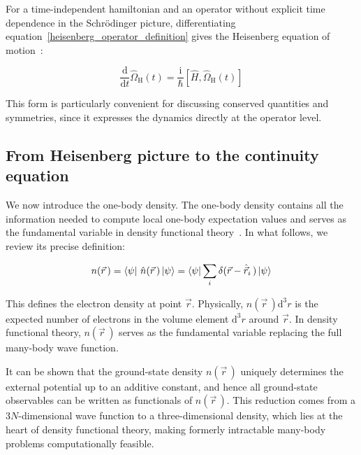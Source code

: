 For a time-independent hamiltonian and an operator without explicit time dependence in the Schrödinger picture, differentiating equation~\eqref{heisenberg_operator_definition} gives the Heisenberg equation of motion~\cite{shankar2012principles}:

\begin{equation}
    \frac{\mathrm{d}}{\mathrm{d}t}\hat{\Omega}_\mathrm{H}(t)
    =\frac{\mathrm{i}}{\hbar}\left[\hat{H},\hat{\Omega}_\mathrm{H}(t)\right]
\label{heisenberg_equation_of_motion}
\end{equation}

This form is particularly convenient for discussing conserved quantities and symmetries, since it expresses the dynamics directly at the operator level.

\FloatBarrier
\subsection{From Heisenberg picture to the continuity equation}

We now introduce the one-body density.
The one-body density contains all the information needed to compute local one-body expectation values and serves as the fundamental variable in density functional theory~\cite{hohenberg1964inhomogeneous,jones2015density,maitra2016perspective}.
In what follows, we review its precise definition:

\begin{equation}
    n(\vec{r}\,)
    = \bra{\psi}\,\hat{n}(\vec{r}\,)\ket{\psi}
    = \bra{\psi}\sum_i\delta(\vec{r} - \hat{\vec{r}}_i\,)\ket{\psi}
\label{particle_density_operator_definition}
\end{equation}

This defines the electron density at point $\vec{r}$.
Physically, $n(\vec{r}\,)\mathrm{d}^3r$ is the expected number of electrons in the volume element $\mathrm{d}^3r$ around $\vec{r}$.
In density functional theory, $n(\vec{r}\,)$ serves as the fundamental variable replacing the full many-body wave function.  

It can be shown that the ground-state density $n(\vec{r}\,)$ uniquely determines the external potential up to an additive constant, and hence all ground-state observables can be written as functionals of $n(\vec{r}\,)$.
This reduction comes from a 3$N$-dimensional wave function to a three-dimensional density, which lies at the heart of density functional theory, making formerly intractable many-body problems computationally feasible.

